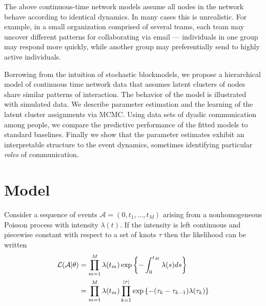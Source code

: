 \documentclass{article}
\begin{document}
The above continuous-time network models assume all nodes in the network behave according to identical dynamics.  In many cases this is unrealistic.  For example, in a small organization comprised of several teams, each team may uncover different patterns for collaborating via email --- individuals in one group may respond more quickly, while another group may preferentially send to highly active individuals.  


Borrowing from the intuition of stochastic blockmodels, we propose a hierarchical model of continuous time network data that assumes latent clusters of nodes share similar patterns of interaction.  The behavior of the model is illustrated with simulated data.  We describe parameter estimation and the learning of the latent cluster assignments via MCMC.  Using data sets of dyadic communication among people, we compare the predictive performance of the fitted models to standard baselines.  Finally we show that the parameter estimates exhibit an interpretable structure to the event dynamics, sometimes identifying particular \emph{roles} of communication.
  
\section{Model}

Consider a sequence of events $\mathcal{A} = (0,t_1, \ldots, t_M)$ arising from a nonhomogeneous Poisson process with  intensity $\lambda(t)$.  If the intensity is left continuous and piecewise constant with respect to a set of knots $\tau$ then the likelihood can be written
\begin{align}
\mathcal{L}(\mathcal{A}|\theta) &= \prod_{m=1}^M \lambda(t_m) \exp\left\{ - \int_{0}^{t_M} \lambda(s)ds \right\} \notag  \\
&= \prod_{m=1}^M \lambda(t_m) \prod_{k=1}^{|\tau|} \exp\left\{ - (\tau_{k} - \tau_{k-1}) \lambda(\tau_k) \right\}%
\end{align}
\end{document}
